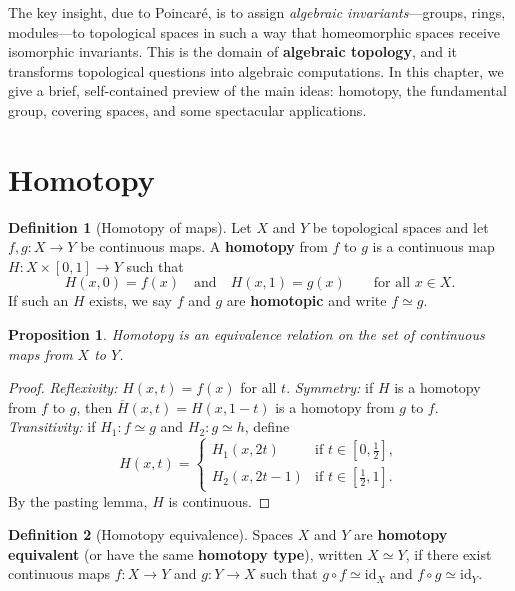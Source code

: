 \documentclass[11pt,a4paper,twoside]{book}
\newtheorem{proposition}[theorem]{Proposition}
\theoremstyle{remark}
\theoremstyle{definition}
\theoremstyle{definition}
\newtheorem{definition}{Definition}[section]
\begin{document}
The key insight, due to Poincar\'{e}, is to
assign \emph{algebraic invariants}---groups, rings, modules---to
topological spaces in such a way that homeomorphic spaces receive
isomorphic invariants.  This is the domain of \textbf{algebraic
topology}, and it transforms topological questions into algebraic
computations.  In this chapter, we give a brief, self-contained preview
of the main ideas: homotopy, the fundamental group, covering spaces,
and some spectacular applications.

\section{Homotopy}
\label{sec:homotopy}

\begin{definition}[Homotopy of maps]
\label{def:homotopy}
Let $X$ and $Y$ be topological spaces and let $f,g\colon X\to Y$ be
continuous maps.  A \textbf{homotopy} from $f$ to $g$ is a continuous
map $H\colon X\times[0,1]\to Y$ such that
\[
  H(x,0) = f(x) \quad\text{and}\quad H(x,1)=g(x)
  \qquad\text{for all }x\in X.
\]
If such an $H$ exists, we say $f$ and $g$ are \textbf{homotopic} and
write $f\simeq g$.
\end{definition}

\begin{proposition}
\label{prop:homotopy-equivalence-relation}
Homotopy is an equivalence relation on the set of continuous maps from
$X$ to $Y$.
\end{proposition}

\begin{proof}
\emph{Reflexivity:} $H(x,t)=f(x)$ for all $t$.
\emph{Symmetry:} if $H$ is a homotopy from $f$ to $g$, then
$\overline{H}(x,t)=H(x,1-t)$ is a homotopy from $g$ to $f$.
\emph{Transitivity:} if $H_1\colon f\simeq g$ and $H_2\colon g\simeq h$,
define
\[
  H(x,t) = \begin{cases}
    H_1(x,2t)   & \text{if }t\in[0,\tfrac{1}{2}],\\
    H_2(x,2t-1) & \text{if }t\in[\tfrac{1}{2},1].
  \end{cases}
\]
By the pasting lemma, $H$ is continuous.
\end{proof}

\begin{definition}[Homotopy equivalence]
\label{def:homotopy-equivalence}
Spaces $X$ and $Y$ are \textbf{homotopy equivalent} (or have the same
\textbf{homotopy type}), written $X\simeq Y$, if there exist continuous
maps $f\colon X\to Y$ and $g\colon Y\to X$ such that $g\circ f\simeq
\mathrm{id}_X$ and $f\circ g\simeq\mathrm{id}_Y$.
\end{definition}
\end{document}
